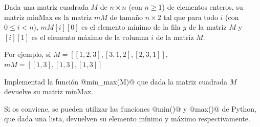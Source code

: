 
\UsePython

\Statement

Dada una matriz cuadrada $M$ de $ n\times n$ (con $n\geq 1$) de elementos enteros,
su matriz minMax es la matriz $mM$ de tamaño $n\times 2$ tal que para todo $i$ (con $0\leq i <n$),
$mM[i][0]$ es el elemento mínimo de la fila $y$ de la matriz $M$ y $[i][1]$ es
el elemento máximo de la columna $i$ de la matriz $M$.

\medskip

Por ejemplo, si $M = [[1,2,3], [3,1,2], [2,3,1]]$, $mM = [[1,3], [1,3], [1,3]]$

\medskip

Implementad la función @min_max(M)@ que dada la matriz cuadrada $M$
devuelve su matriz minMax.

\medskip

Si os conviene, se pueden utilizar las funciones @min()@ y @max()@ de Python,
que dada una lista, devuelven su elemento mínimo y máximo respectivamente.

\SampleSession
